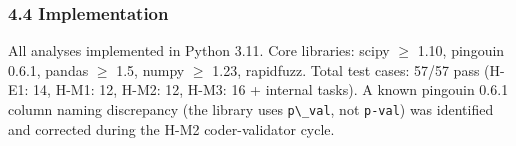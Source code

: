 \subsubsection{4.4 Implementation}

All analyses implemented in Python 3.11. Core libraries: scipy $\geq$ 1.10, pingouin 0.6.1, pandas $\geq$ 1.5, numpy $\geq$ 1.23, rapidfuzz. Total test cases: 57/57 pass (H-E1: 14, H-M1: 12, H-M2: 12, H-M3: 16 + internal tasks). A known pingouin 0.6.1 column naming discrepancy (the library uses \texttt{p\textbackslash \_val}, not \texttt{p-val}) was identified and corrected during the H-M2 coder-validator cycle.

